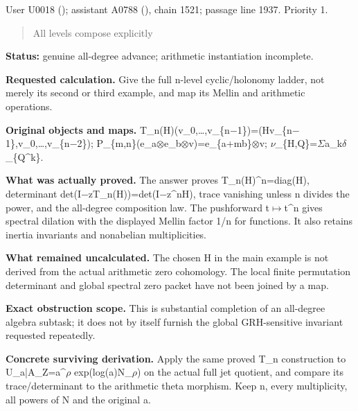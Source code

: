 \documentclass[10pt,a4paper,oneside]{report}
\begin{document}
User U0018 (\protect{});
assistant A0788 (\protect{}),
chain 1521; passage line 1937. Priority 1.

\begin{quote}
All levels compose explicitly
\end{quote}

\textbf{Status:} genuine all-degree advance; arithmetic instantiation
incomplete.

\textbf{Requested calculation.} Give the full n-level cyclic/holonomy
ladder, not merely its second or third example, and map its Mellin and
arithmetic operations.

\textbf{Original objects and maps.}
T\_n(H)(v\_0,…,v\_\{n\allowbreak{}\ensuremath{−}\allowbreak{}1\})=(Hv\_\{n\allowbreak{}\ensuremath{−}\allowbreak{}1\},v\_0,…,v\_\{n\allowbreak{}\ensuremath{−}\allowbreak{}2\});
P\_\{m,n\}(e\_a\allowbreak{}\ensuremath{⊗}\allowbreak{}e\_b\allowbreak{}\ensuremath{⊗}\allowbreak{}v)=e\_\{a+mb\}\allowbreak{}\ensuremath{⊗}\allowbreak{}v;
\allowbreak{}\ensuremath{ν}\allowbreak{}\_\{H,Q\}=\allowbreak{}\ensuremath{Σ}\allowbreak{}a\_k\allowbreak{}\ensuremath{δ}\allowbreak{}\_\{Q\textasciicircum{}k\}.

\textbf{What was actually proved.} The answer proves
T\_n(H)\^{}n=diag(H), determinant
det(I\allowbreak{}\ensuremath{−}\allowbreak{}zT\_n(H))=det(I\allowbreak{}\ensuremath{−}\allowbreak{}z\textasciicircum{}nH),
trace vanishing unless n divides the power, and the all-degree
composition law. The pushforward
t\allowbreak{}\ensuremath{↦}\allowbreak{}t\textasciicircum{}n gives
spectral dilation with the displayed Mellin factor 1/n for functions. It
also retains inertia invariants and nonabelian multiplicities.

\textbf{What remained uncalculated.} The chosen H in the main example is
not derived from the actual arithmetic zero cohomology. The local finite
permutation determinant and global spectral zero packet have not been
joined by a map.

\textbf{Exact obstruction scope.} This is substantial completion of an
all-degree algebra subtask; it does not by itself furnish the global
GRH-sensitive invariant requested repeatedly.

\textbf{Concrete surviving derivation.} Apply the same proved T\_n
construction to
U\_a|A\_Z=a\textasciicircum{}\allowbreak{}\ensuremath{ρ}\allowbreak{}
exp(log(a)N\_\allowbreak{}\ensuremath{ρ}\allowbreak{}) on the actual
full jet quotient, and compare its trace/determinant to the arithmetic
theta morphism. Keep n, every multiplicity, all powers of N and the
original a.
\end{document}
